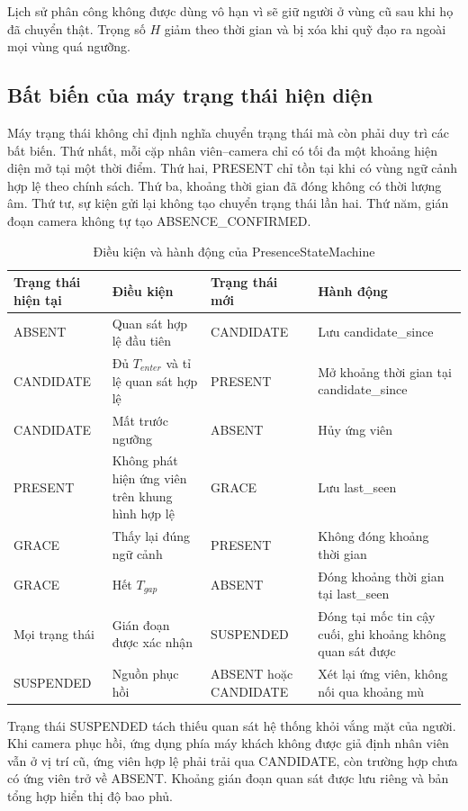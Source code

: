 Lịch sử phân công không được dùng vô hạn vì sẽ giữ người ở vùng cũ sau khi họ đã chuyển thật. Trọng số $H$ giảm theo thời gian và bị xóa khi quỹ đạo ra ngoài mọi vùng quá ngưỡng.

\subsection{Bất biến của máy trạng thái hiện diện}
Máy trạng thái không chỉ định nghĩa chuyển trạng thái mà còn phải duy trì các bất biến. Thứ nhất, mỗi cặp nhân viên--camera chỉ có tối đa một khoảng hiện diện mở tại một thời điểm. Thứ hai, PRESENT chỉ tồn tại khi có vùng ngữ cảnh hợp lệ theo chính sách. Thứ ba, khoảng thời gian đã đóng không có thời lượng âm. Thứ tư, sự kiện gửi lại không tạo chuyển trạng thái lần hai. Thứ năm, gián đoạn camera không tự tạo ABSENCE\_CONFIRMED.

\begin{table}[H]
\centering
\caption{Điều kiện và hành động của PresenceStateMachine}
\label{tab:presence-transition-detail}
\begin{tabularx}{\textwidth}{p{2.7cm}p{3.1cm}X X}
\toprule
\textbf{Trạng thái hiện tại} & \textbf{Điều kiện} & \textbf{Trạng thái mới} & \textbf{Hành động}\\
\midrule
ABSENT & Quan sát hợp lệ đầu tiên & CANDIDATE & Lưu candidate\_since\\
CANDIDATE & Đủ $T_{enter}$ và tỉ lệ quan sát hợp lệ & PRESENT & Mở khoảng thời gian tại candidate\_since\\
CANDIDATE & Mất trước ngưỡng & ABSENT & Hủy ứng viên\\
PRESENT & Không phát hiện ứng viên trên khung hình hợp lệ & GRACE & Lưu last\_seen\\
GRACE & Thấy lại đúng ngữ cảnh & PRESENT & Không đóng khoảng thời gian\\
GRACE & Hết $T_{gap}$ & ABSENT & Đóng khoảng thời gian tại last\_seen\\
Mọi trạng thái & Gián đoạn được xác nhận & SUSPENDED & Đóng tại mốc tin cậy cuối, ghi khoảng không quan sát được\\
SUSPENDED & Nguồn phục hồi & ABSENT hoặc CANDIDATE & Xét lại ứng viên, không nối qua khoảng mù\\
\bottomrule
\end{tabularx}
\end{table}

Trạng thái SUSPENDED tách thiếu quan sát hệ thống khỏi vắng mặt của người. Khi camera phục hồi, ứng dụng phía máy khách không được giả định nhân viên vẫn ở vị trí cũ, ứng viên hợp lệ phải trải qua CANDIDATE, còn trường hợp chưa có ứng viên trở về ABSENT. Khoảng gián đoạn quan sát được lưu riêng và bản tổng hợp hiển thị độ bao phủ.

